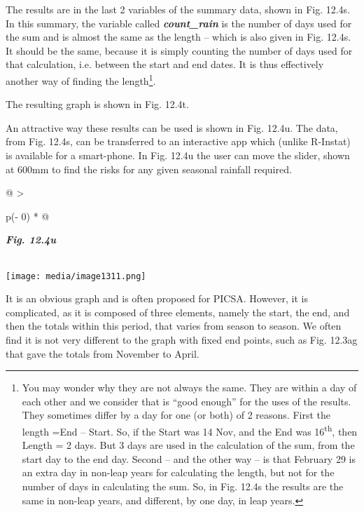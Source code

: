 \documentclass[
  letterpaper,
  DIV=11,
  numbers=noendperiod]{scrreprt}
\begin{document}
The results are in the last 2 variables of the summary data, shown in
Fig. 12.4s. In this summary, the variable called
\textbf{\emph{count\_rain}} is the number of days used for the sum and
is almost the same as the length -- which is also given in Fig. 12.4s.
It should be the same, because it is simply counting the number of days
used for that calculation, i.e. between the start and end dates. It is
thus effectively another way of finding the length\footnote{You may
  wonder why they are not always the same. They are within a day of each
  other and we consider that is ``good enough'' for the uses of the
  results. They sometimes differ by a day for one (or both) of 2
  reasons. First the length =End -- Start. So, if the Start was 14 Nov,
  and the End was 16\textsuperscript{th}, then Length = 2 days. But 3
  days are used in the calculation of the sum, from the start day to the
  end day. Second -- and the other way -- is that February 29 is an
  extra day in non-leap years for calculating the length, but not for
  the number of days in calculating the sum. So, in Fig. 12.4s the
  results are the same in non-leap years, and different, by one day, in
  leap years.}.

The resulting graph is shown in Fig. 12.4t.

An attractive way these results can be used is shown in Fig. 12.4u. The
data, from Fig. 12.4s, can be transferred to an interactive app which
(unlike R-Instat) is available for a smart-phone. In Fig. 12.4u the user
can move the slider, shown at 600mm to find the risks for any given
seasonal rainfall required.

\begin{longtable}[]{@{}
  >{\raggedright\arraybackslash}p{(\columnwidth - 0\tabcolsep) * }@{}}
\toprule\noalign{}
\begin{minipage}[b]{\linewidth}\raggedright
\textbf{\emph{Fig. 12.4u}}
\end{minipage} \\
\midrule\noalign{}
\endhead
\bottomrule\noalign{}
\endlastfoot
\texttt{[image: media/image1311.png]} \\
\end{longtable}

It is an obvious graph and is often proposed for PICSA. However, it is
complicated, as it is composed of three elements, namely the start, the
end, and then the totals within this period, that varies from season to
season. We often find it is not very different to the graph with fixed
end points, such as Fig. 12.3ag that gave the totals from November to
April.
\end{document}
